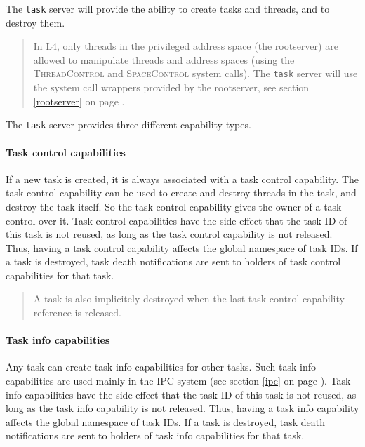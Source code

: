\documentclass[9pt,a4paper]{extarticle}
\newenvironment{comment}{\footnotesize \begin{quote}}{\end{quote}}
\begin{document}
The \texttt{task} server will provide the ability to create tasks and
threads, and to destroy them.

\begin{comment}
  In L4, only threads in the privileged address space (the rootserver)
  are allowed to manipulate threads and address spaces (using the
  \textsc{ThreadControl} and \textsc{SpaceControl} system calls).  The
  \texttt{task} server will use the system call wrappers provided by
  the rootserver, see section \ref{rootserver} on page
  \pageref{rootserver}.
\end{comment}

The \texttt{task} server provides three different capability types.

\paragraph{Task control capabilities}
If a new task is created, it is always associated with a task control
capability.  The task control capability can be used to create and
destroy threads in the task, and destroy the task itself.  So the task
control capability gives the owner of a task control over it.  Task
control capabilities have the side effect that the task ID of this
task is not reused, as long as the task control capability is not
released.  Thus, having a task control capability affects the global
namespace of task IDs.  If a task is destroyed, task death
notifications are sent to holders of task control capabilities for
that task.

\begin{comment}
  A task is also implicitely destroyed when the last task control
  capability reference is released.
\end{comment}

\paragraph{Task info capabilities}
\label{taskinfocap}
Any task can create task info capabilities for other tasks.  Such task
info capabilities are used mainly in the IPC system (see section
\ref{ipc} on page \pageref{ipc}).  Task info capabilities have the
side effect that the task ID of this task is not reused, as long as
the task info capability is not released.  Thus, having a task info
capability affects the global namespace of task IDs.  If a task is
destroyed, task death notifications are sent to holders of task info
capabilities for that task.
\end{document}
